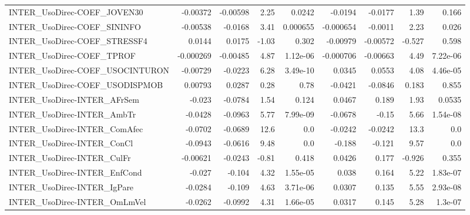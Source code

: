 \begin{tabular}{lrrrrrrrr}
INTER\_UsoDirec-COEF\_JOVEN30            &    -0.00372 &     -0.00598 &     2.25 &   0.0242 &    -0.0194 &     -0.0177 &         1.39 &         0.166 \\
INTER\_UsoDirec-COEF\_SININFO            &    -0.00538 &      -0.0168 &     3.41 & 0.000655 &  -0.000654 &     -0.0011 &         2.23 &         0.026 \\
INTER\_UsoDirec-COEF\_STRESSF4           &      0.0144 &       0.0175 &    -1.03 &    0.302 &   -0.00979 &    -0.00572 &       -0.527 &         0.598 \\
INTER\_UsoDirec-COEF\_TPROF              &   -0.000269 &     -0.00485 &     4.87 & 1.12e-06 &  -0.000706 &    -0.00663 &         4.49 &      7.22e-06 \\
INTER\_UsoDirec-COEF\_USOCINTURON        &    -0.00729 &      -0.0223 &     6.28 & 3.49e-10 &     0.0345 &      0.0553 &         4.08 &      4.46e-05 \\
INTER\_UsoDirec-COEF\_USODISPMOB         &     0.00793 &       0.0287 &     0.28 &     0.78 &    -0.0421 &     -0.0846 &        0.183 &         0.855 \\
INTER\_UsoDirec-INTER\_AFrSem            &      -0.023 &      -0.0784 &     1.54 &    0.124 &     0.0467 &       0.189 &         1.93 &        0.0535 \\
INTER\_UsoDirec-INTER\_AmbTr             &     -0.0428 &      -0.0963 &     5.77 & 7.99e-09 &    -0.0678 &       -0.15 &         5.66 &      1.54e-08 \\
INTER\_UsoDirec-INTER\_ComAfec           &     -0.0702 &      -0.0689 &     12.6 &      0.0 &    -0.0242 &     -0.0242 &         13.3 &           0.0 \\
INTER\_UsoDirec-INTER\_ConCl             &     -0.0943 &      -0.0616 &     9.48 &      0.0 &     -0.188 &      -0.121 &         9.57 &           0.0 \\
INTER\_UsoDirec-INTER\_CulFr             &    -0.00621 &      -0.0243 &    -0.81 &    0.418 &     0.0426 &       0.177 &       -0.926 &         0.355 \\
INTER\_UsoDirec-INTER\_EnfCond           &      -0.027 &       -0.104 &     4.32 & 1.55e-05 &      0.038 &       0.164 &         5.22 &      1.83e-07 \\
INTER\_UsoDirec-INTER\_IgPare            &     -0.0284 &       -0.109 &     4.63 & 3.71e-06 &     0.0307 &       0.135 &         5.55 &      2.93e-08 \\
INTER\_UsoDirec-INTER\_OmLmVel           &     -0.0262 &      -0.0992 &     4.31 & 1.66e-05 &     0.0317 &       0.145 &         5.28 &       1.3e-07 \\

\end{tabular}
